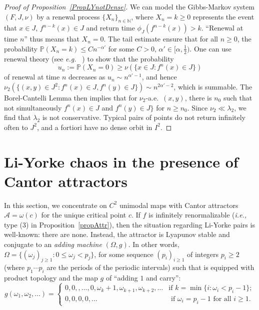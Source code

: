 \documentclass[12pt, psamsfonts, reqno]{amsart}
\begin{document}
\begin{proof}[Proof of Proposition~\ref{PropLYnotDense}]
We can model the Gibbs-Markov system $(F,J,\nu)$
by a renewal process $\{ X_n \}_{n \in {{\mathbb N}}}$,
where $X_n = k \geq 0$ represents the event that $x \in J$, $f^{n-k}(x) \in J$
and return time $\phi_J(f^{n-k}(x)) > k$.
``Renewal at time $n$'' thus means that $X_n = 0$.
The tail estimate ensure that for all $n \geq 0$,
the probability ${{\mathbb P}}(X_n = k) \leq C n^{-\alpha'}$
for some $C > 0$, $\alpha' \in [\alpha, \frac12)$.
One can use renewal theory (see {{\em e.g.~}} \cite[Section 8.7]{renewal}) to show that
the probability
\[
u_n := {{\mathbb P}}(X_n = 0) \geq  \nu(\{ x \in J : f^n(x) \in J\})
\]
of renewal at time $n$ decreases as $u_n \sim n^{\alpha'-1}$,
and hence $\nu_2(\{ (x,y) \in J^2 : f^n(x) \in J, f^n(y) \in J\})
\sim n^{2\alpha'-2}$, which is summable.
The Borel-Cantelli Lemma then implies that for $\nu_2$-a.e.\ $(x,y)$,
there is $n_0$ such that not simultaneously $f^n(x) \in J$ and
$f^n(y) \in J\}$
for $n \geq n_0$. Since $\nu_2 \ll \lambda_2$, we find that $\lambda_2$
is not conservative. Typical pairs of points do not return infinitely often to
$J^2$, and a fortiori have no dense orbit in $I^2$.
\end{proof}
\fi

\section{Li-Yorke chaos in the presence of Cantor attractors}\label{sec:attractors}

In this section, we concentrate on $C^2$ unimodal maps with Cantor
attractors ${{\mathcal A}} = \omega(c)$ for the unique critical point $c$.
If $f$ is infinitely renormalizable ({{\em i.e., }} type (3) in
Proposition~\ref{propAttr}), then the situation regarding Li-Yorke
pairs is well-known: there are none. Instead, the attractor
is Lyapunov stable and conjugate to an {\em adding machine}
$(\Omega, g)$. In other words, $\Omega = \{ (\omega_j)_{j \geq 1}
: 0 \leq \omega_j < p_j \}$, for some sequence $(p_i)_{i \geq 1}$
of integers $p_i \geq 2$ (where $p_1 \cdots p_i$ are the periods of
the periodic intervals)
such that is equipped with product topology and the map
$g$ of ``adding $1$ and carry'':
\begin{equation}\label{eq:addingmachine}
{g}( \omega_1,\omega_2, \dots) = \left\{ \begin{array}{ll}
0,0,,\dots, 0,\omega_k+1,\omega_{k+1},\omega_{k+2},\dots & \text{
if }
k = \min\{ i : \omega_i < p_i-1\}; \\
0,0,0,0,\dots & \text{ if } \omega_i = p_i-1 \text{ for all } i
\geq 1.
\end{array}\right.
\end{equation}
\end{document}
